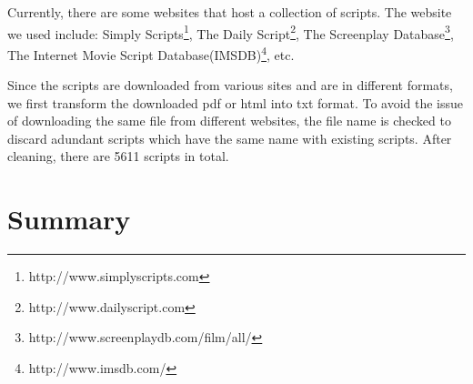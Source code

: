 Currently, there are some websites that host a collection of scripts. 
The website we used include: Simply Scripts\footnote{http://www.simplyscripts.com}, The Daily Script\footnote{http://www.dailyscript.com}, The Screenplay Database\footnote{http://www.screenplaydb.com/film/all/}, The Internet Movie Script Database(IMSDB)\footnote{http://www.imsdb.com/}, etc. 

Since the scripts are downloaded from various sites and are in different formats, we first transform the downloaded pdf or html into txt format. 
To avoid the issue of downloading the same file from different websites, the file name is checked to discard adundant scripts which have the same name with existing scripts. 
After cleaning, there are 5611 scripts in total. 

\section{Summary}

